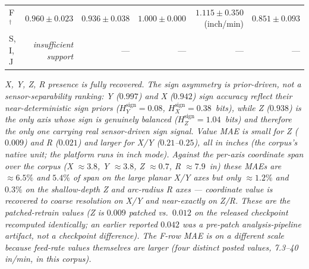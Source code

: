 \begin{table}[!t]
{\begin{tabular}{l r r r r r}
F$^{\dagger}$ & $0.960 \pm 0.023$ & $0.936 \pm 0.038$ & $1.000 \pm 0.000$ & $1.115 \pm 0.350$~(inch/min) & $0.851 \pm 0.093$ \\
S, I, J & \emph{insufficient support} & --- & --- & --- & --- \\
\bottomrule
\end{tabular}%
}
\par\smallskip
\footnotesize\textit{X, Y, Z, R presence is fully recovered. The sign asymmetry is prior-driven, not a sensor-separability ranking: Y ($0.997$) and X ($0.942$) sign accuracy reflect their near-deterministic sign priors ($H_{Y}^{\text{sign}}\!=\!0.08$, $H_{X}^{\text{sign}}\!=\!0.38$~bits), while Z ($0.938$) is the only axis whose sign is genuinely balanced ($H_{Z}^{\text{sign}}\!=\!1.04$~bits) and therefore the only one carrying real sensor-driven sign signal. Value MAE is small for Z ($0.009$) and R ($0.021$) and larger for X/Y ($0.21$--$0.25$), all in \emph{inches} (the corpus's native unit; the platform runs in inch mode). Against the per-axis coordinate span over the corpus (X $\approx\!3.8$, Y $\approx\!3.8$, Z $\approx\!0.7$, R $\approx\!7.9$~in) these MAEs are $\approx\!6.5\%$ and $5.4\%$ of span on the large planar X/Y axes but only $\approx\!1.2\%$ and $0.3\%$ on the shallow-depth Z and arc-radius R axes --- coordinate value is recovered to coarse resolution on X/Y and near-exactly on Z/R. These are the patched-retrain values (Z is $0.009$ patched vs.\ $0.012$ on the released checkpoint recomputed identically; an earlier reported $0.042$ was a pre-patch analysis-pipeline artifact, not a checkpoint difference). The F-row MAE is on a different scale because feed-rate values themselves are larger (four distinct posted values, 7.3--40 in/min, in this corpus).}
\end{table}
